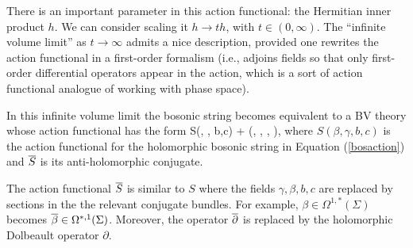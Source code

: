 There is an important parameter in this action functional: the Hermitian inner product $h$.
We can consider scaling it $h \to t h$, with $t \in (0,\infty)$.
The ``infinite volume limit'' as $t \to \infty$ admits a nice description,
provided one rewrites the action functional in a first-order formalism
(i.e., adjoins fields so that only first-order differential operators appear in the action,
which is a sort of action functional analogue of working with phase space).

\begin{lem} 
In this infinite volume limit
the bosonic string becomes equivalent to a BV theory whose action functional has the form
\ben
S(\beta, \gamma, b,c) + (\Bar{\beta}, \Bar{\gamma}, , ),
\een
where $S(\beta, \gamma, b,c)$ is the action functional for the holomorphic bosonic string in Equation (\ref{bosaction}) and $\Bar{S}$ is its anti-holomorphic conjugate. 
\end{lem}


\begin{rmk} 
The action functional $\Bar{S}$ is similar to $S$ where the fields $\gamma,\beta,b,c$ are replaced by sections in the the relevant conjugate bundles. 
For example, $\beta \in \Omega^{1,*}(\Sigma)$ becomes $\Bar{\beta} \in \Omega^{*,1} (\Sigma)$. 
Moreover, the operator $\dbar$ is replaced by the holomorphic Dolbeault operator $\partial$. 
\end{rmk}

